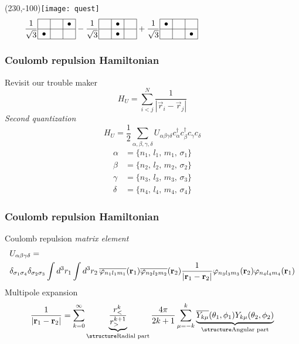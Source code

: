\begin{frame}[t]
  \Put(230,-100){\texttt{[image: quest]}} \pause
  \alert{\[\frac{1}{\sqrt{3}}
  \begin{array}{|c|c|c|}
  \hline
  & \phantom{\bullet} & \bullet \\ \hline
  \bullet &  &  \\
  \hline
  \end{array}
  - \frac{1}{\sqrt{3}}
  \begin{array}{|c|c|c|}
  \hline
  \phantom{\bullet} & \bullet & \phantom{\bullet} \\ \hline
  & \bullet &  \\
  \hline
  \end{array}
  + \frac{1}{\sqrt{3}}
  \begin{array}{|c|c|c|}
  \hline
  \bullet & \phantom{\bullet} & \\ \hline
  &  & \bullet \\
  \hline
  \end{array}\qquad\qquad\qquad\qquad\qquad\]}
\end{frame}

\begin{frame}[t]
  \frametitle{Coulomb repulsion Hamiltonian}
  \footnotesize
  Revisit our \alert{trouble maker}
  \[ H_U = \sum_{i<j}^N \frac{1}{|\vec{r}_i - \vec{r}_j|} \]
  \emph{Second quantization}
  \begin{equation*}
  H_U = \frac{1}{2} \sum_{\alpha,\beta,\gamma,\delta} U_{\alpha\beta\gamma\delta} c_\alpha^\dag c_\beta^\dag c_\gamma c_\delta
  \end{equation*}
  \begin{align*}
  \alpha & = \{n_1,\,l_1,\,m_1,\,\sigma_1\} \\
  \beta  & = \{n_2,\,l_2,\,m_2,\,\sigma_2\} \\
  \gamma & = \{n_3,\,l_3,\,m_3,\,\sigma_3\} \\
  \delta & = \{n_4,\,l_4,\,m_4,\,\sigma_4\}
  \end{align*}
\end{frame}

\begin{frame}[t]
  \frametitle{Coulomb repulsion Hamiltonian}
  \footnotesize
  Coulomb repulsion \emph{matrix element}
  \begin{align*} & U_{\alpha\beta\gamma\delta} = \\
  & \delta_{\sigma_1\sigma_4} \delta_{\sigma_2\sigma_3} \int d^3r_1 \int d^3r_2 \,
  \overline{\varphi_{n_1l_1m_1}}(\mathbf{r}_1) \overline{\varphi_{n_2l_2m_2}}(\mathbf{r}_2)
  \frac{1}{|\mathbf{r}_1 - \mathbf{r}_2|}
  \varphi_{n_3l_3m_3}(\mathbf{r}_2) \varphi_{n_4l_4m_4}(\mathbf{r}_1) \end{align*} \pause
  Multipole expansion
  \[\frac{1}{|\vec{r}_1-\vec{r}_2|} = \sum_{k=0}^\infty \underbrace{\frac{r_<^k}{r_>^{k+1}}}_{\emph{\text{Radial part}}} \frac{4\pi}{2k+1}
    \sum_{\mu=-k}^k \underbrace{\conj{Y_{k\mu}}(\theta_1,\phi_1) Y_{k\mu}(\theta_2,\phi_2)}_{\emph{\text{Angular part}}}\]
\end{frame}

